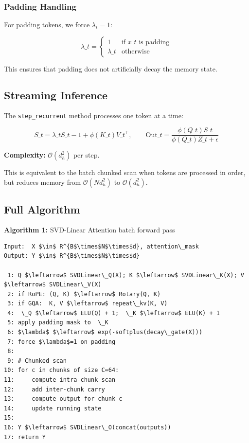 \subsubsection{Padding Handling}

For padding tokens, we force $\lambda_t = 1$:

\[
\lambda\_t = \begin{cases} 1 & \text{if } x\_t \text{ is padding} \\ \lambda\_t & \text{otherwise} \end{cases}
\tag{4.15}
\]

This ensures that padding does not artificially decay the memory state.

\subsection{Streaming Inference}

The \texttt{step\_recurrent} method processes one token at a time:

\[
S\_t = \lambda\_t S\_{t-1} + \phi(K\_t) V\_t^\top, \qquad
\text{Out}\_t = \frac{\phi(Q\_t) S\_t}{\phi(Q\_t) Z\_t + \epsilon}
\tag{4.16}
\]

\textbf{Complexity:} $\mathcal{O}(d_h^2)$ per step.

This is equivalent to the batch chunked scan when tokens are processed in 
order, but reduces memory from $\mathcal{O}(N d_h^2)$ to $\mathcal{O}(d_h^2)$.

\subsection{Full Algorithm}

\textbf{Algorithm 1:} SVD-Linear Attention batch forward pass
\begin{lstlisting}
Input:  X $\in$ R^{B$\times$N$\times$d}, attention\_mask
Output: Y $\in$ R^{B$\times$N$\times$d}

 1: Q $\leftarrow$ SVDLinear\_Q(X); K $\leftarrow$ SVDLinear\_K(X); V $\leftarrow$ SVDLinear\_V(X)
 2: if RoPE: (Q, K) $\leftarrow$ Rotary(Q, K)
 3: if GQA:  K, V $\leftarrow$ repeat\_kv(K, V)
 4:  \_Q $\leftarrow$ ELU(Q) + 1;  \_K $\leftarrow$ ELU(K) + 1
 5: apply padding mask to  \_K
 6: $\lambda$ $\leftarrow$ exp(-softplus(decay\_gate(X)))
 7: force $\lambda$=1 on padding
 8:
 9: # Chunked scan
10: for c in chunks of size C=64:
11:     compute intra-chunk scan
12:     add inter-chunk carry
13:     compute output for chunk c
14:     update running state
15:
16: Y $\leftarrow$ SVDLinear\_O(concat(outputs))
17: return Y
\end{lstlisting}

